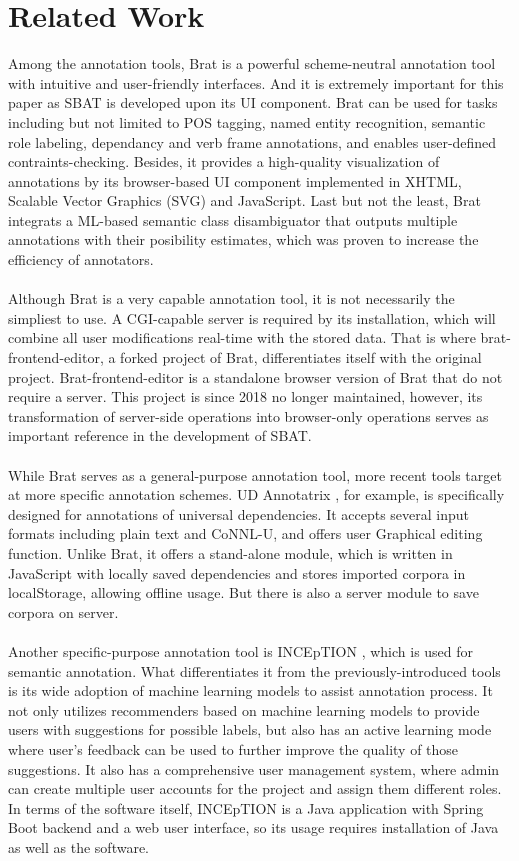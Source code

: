 \documentclass[a4paper]{article}
\begin{document}
\section{Related Work}
Among the annotation tools, Brat \cite{stenetorp-etal-2012-brat} is a powerful scheme-neutral annotation tool with intuitive and user-friendly interfaces. And it is extremely important for this paper as SBAT is developed upon its UI component. Brat can be used for tasks including but not limited to POS tagging, named entity recognition, semantic role labeling, dependancy and verb frame annotations, and enables user-defined contraints-checking. Besides, it provides a high-quality visualization of annotations by its browser-based UI component implemented in XHTML, Scalable Vector Graphics (SVG) and JavaScript. Last but not the least, Brat integrats a ML-based semantic class disambiguator that outputs multiple annotations with their posibility estimates, which was proven to increase the efficiency of annotators.\\
\\
Although Brat is a very capable annotation tool, it is not necessarily the simpliest to use. A CGI-capable server is required by its installation, which will combine all user modifications real-time with the stored data. That is where brat-frontend-editor, a forked project of Brat, differentiates itself with the original project. Brat-frontend-editor \cite{brat-frontend-editor} is a standalone browser version of Brat that do not require a server. This project is since 2018 no longer maintained, however, its transformation of server-side operations into browser-only operations serves as important reference in the development of SBAT.\\
\\
While Brat serves as a general-purpose annotation tool, more recent tools target at more specific annotation schemes. UD Annotatrix \cite{tyers-etal-2017-ud}, for example, is specifically designed for annotations of universal dependencies. It accepts several input formats including plain text and CoNNL-U, and offers user Graphical editing function. Unlike Brat, it offers a stand-alone module, which is written in JavaScript with locally saved dependencies and stores imported corpora in localStorage, allowing offline usage. But there is also a server module to save corpora on server.\\
\\
Another specific-purpose annotation tool is INCEpTION \cite{klie-etal-2018-inception}, which is used for semantic annotation. What differentiates it from the previously-introduced tools is its wide adoption of machine learning models to assist annotation process. It not only utilizes recommenders based on machine learning models to provide users with suggestions for possible labels, but also has an active learning mode where user's feedback can be used to further improve the quality of those suggestions. It also has a comprehensive user management system, where admin can create multiple user accounts for the project and assign them different roles. In terms of the software itself, INCEpTION is a Java application with Spring Boot backend and a web user interface, so its usage requires installation of Java as well as the software.\\
\end{document}
